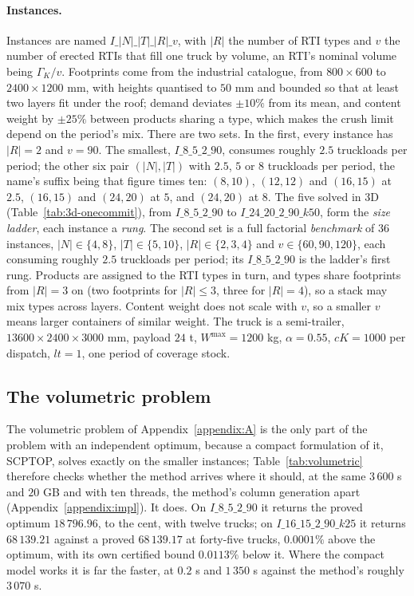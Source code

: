 \paragraph{Instances.}
Instances are named $I\_|N|\_|T|\_|R|\_v$, with $|R|$ the number of
RTI types and $v$ the number of erected RTIs that fill one truck by
volume, an RTI's nominal volume being $\Gamma_{K}/v$. Footprints come
from the industrial catalogue, from $800\times600$ to $2400\times1200$
mm, with heights quantised to $50$ mm and bounded so that at least two
layers fit under the roof; demand deviates $\pm10\%$ from its mean, and
content weight by $\pm25\%$ between products sharing a type, which
makes the crush limit depend on the period's mix. There are two sets.
In the first, every instance has $|R|=2$ and $v=90$. The smallest,
$I\_8\_5\_2\_90$, consumes
roughly $2.5$ truckloads per period; the other six pair $(|N|,|T|)$
with $2.5$, $5$ or $8$ truckloads per period, the name's suffix being
that figure times ten: $(8,10)$, $(12,12)$ and $(16,15)$ at $2.5$,
$(16,15)$ and $(24,20)$ at $5$, and $(24,20)$ at $8$. The five solved
in 3D (Table~\ref{tab:3d-onecommit}), from $I\_8\_5\_2\_90$ to
$I\_24\_20\_2\_90\_k50$, form the \emph{size ladder}, each instance a
\emph{rung}. The second set is a full factorial \emph{benchmark} of
$36$ instances, $|N|\in\{4,8\}$, $|T|\in\{5,10\}$, $|R|\in\{2,3,4\}$
and $v\in\{60,90,120\}$, each consuming roughly $2.5$ truckloads per
period; its $I\_8\_5\_2\_90$ is the ladder's first rung. Products are
assigned to the RTI types in turn, and types share footprints from
$|R|=3$ on (two footprints for $|R|\le3$, three for $|R|=4$), so a
stack may mix types across layers. Content weight does not scale with
$v$, so a smaller $v$ means larger containers of similar weight. The
truck is a semi-trailer, $13600\times2400\times3000$ mm,
payload $24$ t, $W^{\max}=1200$ kg, $\alpha=0.55$, $cK=1000$ per
dispatch, $lt=1$, one period of coverage stock.

\subsection{The volumetric problem}
\label{sec:res-vol}



The volumetric problem of Appendix~\ref{appendix:A} is the only part of
the problem with an independent optimum, because a compact formulation
of it, SCPTOP, solves exactly on the smaller instances; Table~\ref{tab:volumetric}
therefore checks whether the method arrives where it should, at the
same $3\,600$ s and $20$ GB and with ten threads, the method's column
generation apart (Appendix~\ref{appendix:impl}). It does. On $I\_8\_5\_2\_90$
it returns the proved optimum $18\,796.96$, to the cent, with twelve
trucks; on $I\_16\_15\_2\_90\_k25$ it returns $68\,139.21$ against a
proved $68\,139.17$ at forty-five trucks, $0.0001\%$ above the optimum,
with its own certified bound $0.0113\%$ below it. Where the compact
model works it is far the faster, at $0.2$ s and $1\,350$ s against
the method's roughly $3\,070$ s.

